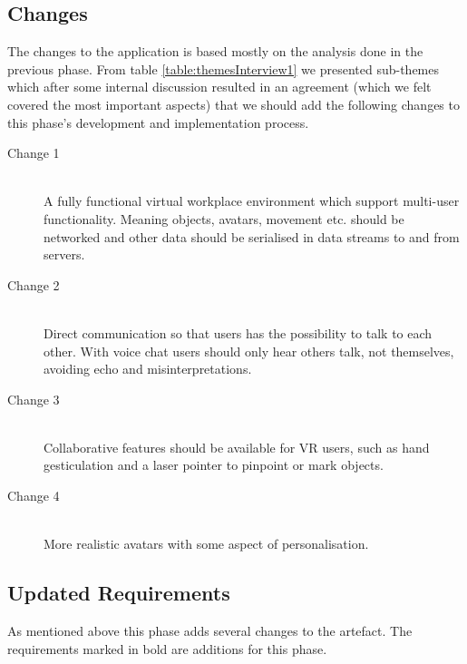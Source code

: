 \subsection{Changes}
The changes to the application is based mostly on the analysis done in the previous phase. From table \ref{table:themesInterview1} we presented sub-themes which after some internal discussion resulted in an agreement (which we felt covered the most important aspects) that we should add the following changes to this phase's development and implementation process. 

\begin{description}
    \item [Change 1]\hfill \\
    A fully functional virtual workplace environment which support multi-user functionality. Meaning objects, avatars, movement etc. should be networked and other data should be serialised in data streams to and from servers. 
    \item [Change 2]\hfill \\
    Direct communication so that users has the possibility to talk to each other. With voice chat users should only hear others talk, not themselves, avoiding echo and misinterpretations.  
    \item [Change 3]\hfill \\
    Collaborative features should be available for VR users, such as hand gesticulation and a laser pointer to pinpoint or mark objects.
    \item [Change 4]\hfill \\
    More realistic avatars with some aspect of personalisation. 
\end{description}





\subsection{Updated Requirements}
As mentioned above this phase adds several changes to the artefact. The requirements marked in bold are additions for this phase.


